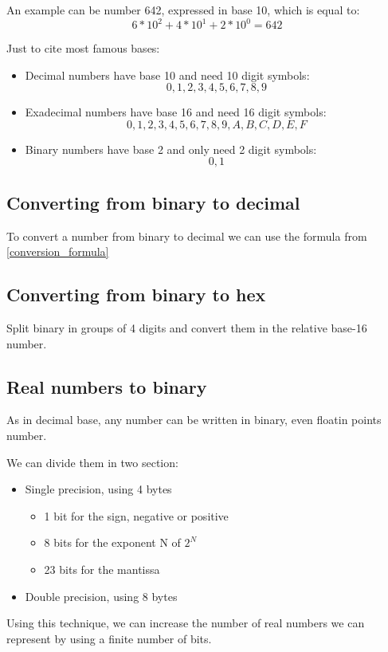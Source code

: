 An example can be number 642, expressed in base 10, which is equal to: 
\begin{equation}
    6 * 10^{2} + 4 * 10^{1} + 2 * 10^{0} = 642
\end{equation}

Just to cite most famous bases: 
\begin{itemize}
    \item Decimal numbers have base 10 and need 10 digit symbols:
    \begin{equation}
        0,1,2,3,4,5,6,7,8,9
    \end{equation}
    \item Exadecimal numbers have base 16 and need 16 digit symbols:
    \begin{equation}
        0,1,2,3,4,5,6,7,8,9,A,B,C,D,E,F
    \end{equation}
    \item Binary numbers have base 2 and only need 2 digit symbols:
    \begin{equation}
        0,1
    \end{equation}
\end{itemize}

\subsection{Converting from binary to decimal}

To convert a number from binary to decimal we can use the formula from \ref{conversion_formula}

\subsection{Converting from binary to hex}

Split binary in groups of 4 digits and convert them in the relative base-16 number. 

\subsection{Real numbers to binary}

As in decimal base, any number can be written in binary, even floatin points number. 
\par 
We can divide them in two section: 

\begin{itemize}
    \item Single precision, using 4 bytes
    \begin{itemize}
        \item 1 bit for the sign, negative or positive
        \item 8 bits for the exponent N of $2^N$
        \item 23 bits for the mantissa 
    \end{itemize}
    \item Double precision, using 8 bytes
\end{itemize}
\par 
Using this technique, we can increase the number of real numbers we can represent by using a finite number of bits. 

